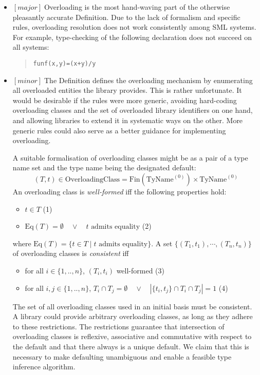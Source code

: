 \documentclass{article}
\newcommand{\m}[1]{$[\mathit{#1}]\;$}
\newcommand{\major}{\m{major}}
\newcommand{\minor}{\m{minor}}
\begin{document}
\begin{itemize}
\item \major Overloading is the most hand-waving part of the otherwise pleasantly accurate Definition. Due to the lack of formalism and specific rules, overloading resolution does not work consistently among SML systems. For example, type-checking of the following declaration does not succeed on all systems:
\begin{quote}
\begin{alltt}
fun f(x,y) = (x + y)/y
\end{alltt}
\end{quote}
\item \minor The Definition defines the overloading mechanism by enumerating all overloaded entities the library provides. This is rather unfortunate. It would be desirable if the rules were more generic, avoiding hard-coding overloading classes and the set of overloaded library identifiers on one hand, and allowing libraries to extend it in systematic ways on the other. More generic rules could also serve as a better guidance for implementing overloading.

A suitable formalisation of overloading classes might be as a pair of a type name set and the type name being the designated default:
\begin{displaymath}
(T,t) \in \mbox{OverloadingClass} = \mbox{Fin}(\mbox{TyName}^{(0)}) \times \mbox{TyName}^{(0)}
\end{displaymath}
An overloading class is {\em well-formed} iff the following properties hold:
\begin{itemize}
\item[] $t \in T$ \hfill (1)
\item[] $\mbox{Eq}(T) = \emptyset \quad\vee\quad \mbox{$t$ admits equality}$ \hfill (2)
\end{itemize}
where $\mbox{Eq}(T) = \{ t \in T \;|\; \mbox{$t$ admits equality} \}$. A set $\{(T_1,t_1),\cdots,(T_n,t_n)\}$ of overloading classes is {\em consistent} iff
\begin{itemize}
\item[] for all $i\in\{1,..,n\}$, \quad $(T_i,t_i)$ well-formed \hfill (3)
\item[] for all $i,j\in\{1,..,n\}$, \quad $T_i \cap T_j = \emptyset \quad\vee\quad |\{t_i,t_j\} \cap T_i \cap T_j| = 1$  \hfill (4)
\end{itemize}

The set of all overloading classes used in an initial basis must be consistent. A library could provide arbitrary overloading classes, as long as they adhere to these restrictions. The restrictions guarantee that intersection of overloading classes is reflexive, associative and commutative with respect to the default and that there always is a unique default. We claim that this is necessary to make defaulting unambiguous and enable a feasible type inference algorithm.


\end{itemize}
\end{document}

